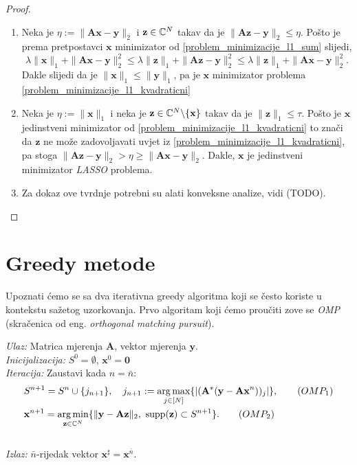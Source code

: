 \documentclass[a4paper,twoside,12pt]{memoir} %
\newcommand{\vect}[1]{\mathbf{#1}}
\renewcommand{\vec}{\vect}
\newcommand{\supp}{\text{\normalfont{supp}}}
\newcommand{\norm}[1]{\|{#1}\|}
\DeclareMathOperator*{\argmax}{arg\,max}
\DeclareMathOperator*{\argmin}{arg\,min}
\newenvironment{alg}[1]
{
    \bigskip
    \begin{tcolorbox}[arc=0mm,boxrule=1.2pt,colframe=black,colback=white,detach title, before upper={\medskip\begin{center}\textbf{#1}\end{center}\hline\newline\medskip},frame hidden]
    \medskip
}
{
    \medskip
\end{tcolorbox}
    \bigskip
}
\begin{document}
\begin{proof}
    \begin{enumerate}[label=(\alph*)]
        \item Neka je $\eta := \norm{\vec{Ax}- \vec y}_2$ i $\vec z \in \C^N$ takav da je $\norm{\vec{Az-y}}_2 \leq \eta$. Po\v{s}to je prema pretpostavci $\vec x$ minimizator od \eqref{problem_minimizacije_l1_sum} slijedi,
            \begin{equation*}
                \lambda \norm{\vec x}_1 + \norm{\vec{Ax} -\vec{y}}_2^2 \leq \lambda \norm{\vec z}_1 + \norm{\vec{Az} - \vec{y}}_2^2 \leq \lambda \norm{\vec z}_1 + \norm{\vec{Ax}-\vec y}_2^2.
            \end{equation*}
            Dakle slijedi da je $\norm{\vec x}_1 \leq \norm{\vec{y}}_1$, pa je $\vec x$ minimizator problema \eqref{problem_minimizacije_l1_kvadraticni}

        \item Neka je $\eta := \norm{\vec x}_1$ i neka je $\vec z \in \C^N\backslash\{\vec x\}$ takav da je $\norm{\vec z}_1 \leq \tau$. Po\v{s}to je $\vec x$ jedinstveni minimizator od \eqref{problem_minimizacije_l1_kvadraticni} to zna\v{c}i da $\vec z$ ne mo\v{z}e zadovoljavati uvjet iz \eqref{problem_minimizacije_l1_kvadraticni}, pa stoga $\norm{\vec{Az}- \vec{y}}_2 > \eta \geq \norm{\vec{Ax}-\vec y}_2$. Dakle, $\vec x$ je jedinstveni minimizator \textit{LASSO} problema.
        \item Za dokaz ove tvrdnje potrebni su alati konveksne analize, vidi (TODO).
    \end{enumerate}
\end{proof}

\section[Greedy metode][Greedy metode]{Greedy metode}
Upoznati \'cemo se sa dva iterativna greedy algoritma koji se \v{c}esto koriste u kontekstu sa\v{z}etog uzorkovanja. Prvo algoritam koji \'cemo prou\v{c}iti zove se \textit{OMP} (skra\v{c}enica od eng. \textit{orthogonal matching pursuit}).
\begin{alg}{OMP}
    \textit{Ulaz:} Matrica mjerenja $\vec A$, vektor mjerenja $\vec y$. \\
    \textit{Inicijalizacija:} $S^0 = \emptyset$, $\vec x^0 = \vec 0$ \\
    \textit{Iteracija:} Zaustavi kada $n = \bar{n}$:
        \begin{align}
            &S^{n+1} = S^n \cup \{j_{n+1}\},\quad j_{n+1} := \argmax\limits_{j \in [N]}\{|(\vec A^*(\vec y - \vec{Ax}^n))_j|\},\tag{$OMP_1$}\label{omp_1}
        \\
            &\vec x^{n+1} = \argmin\limits_{\vec z \in \C^N}\{\norm{\vec y - \vec{Az}}_2,\ \supp(\vec z) \subset S^{n+1}\}.\tag{$OMP_2$}\label{omp_2}
        \end{align} \\
        \textit{Izlaz:} $\bar{n}$-rijedak vektor $\vec x^{\sharp}=\vec{x}^{\bar{n}}$.
\end{alg}
\end{document}
